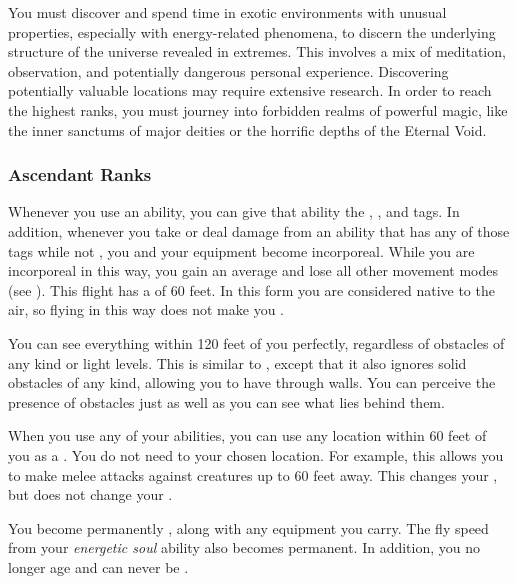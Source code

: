      You must discover and spend time in exotic environments with unusual properties, especially with energy-related phenomena, to discern the underlying structure of the universe revealed in extremes.
    This involves a mix of meditation, observation, and potentially dangerous personal experience.
    Discovering potentially valuable locations may require extensive research.
    In order to reach the highest ranks, you must journey into forbidden realms of powerful magic, like the inner sanctums of major deities or the horrific depths of the Eternal Void.

    \subsubsection{Ascendant Ranks}

       Whenever you use an ability, you can give that ability the \atCold, \atElectricity, and \atFire tags.
      In addition, whenever you take or deal damage from an ability that has any of those tags while not , you and your equipment \briefly become incorporeal.
      While you are incorporeal in this way, you gain an average  and lose all other movement modes (see ).
      This flight has a  of 60 feet.
      In this form you are considered native to the air, so flying in this way does not make you \unsteady.

       You can see everything within 120 feet of you perfectly, regardless of obstacles of any kind or light levels.
      This is similar to , except that it also ignores solid obstacles of any kind, allowing you to have  through walls.
      You can perceive the presence of obstacles just as well as you can see what lies behind them.

       When you use any of your abilities, you can use any location within 60 feet of you as a .
      You do not need  to your chosen location.
      For example, this allows you to make melee attacks against creatures up to 60 feet away.
      This changes your , but does not change your .

       You become permanently , along with any equipment you carry.
      The fly speed from your \textit{energetic soul} ability also becomes permanent.
      In addition, you no longer age and can never be .

